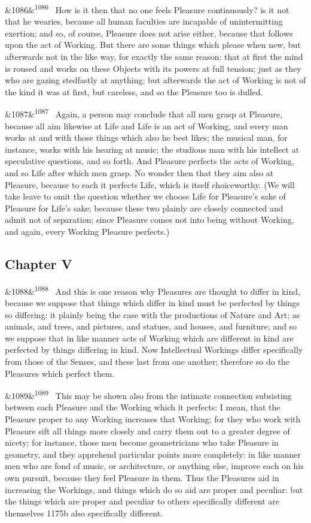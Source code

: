 \documentclass[12pt]{article}
\newcommand{\para}[1][]{\par\noindent\ifx&#1&\else\textsuperscript{\footnotesize #1}~\fi}
\begin{document}
\para[1086] How is it then that no one feels Pleasure continuously? is it not that he wearies, because all human faculties are incapable of unintermitting exertion; and so, of course, Pleasure does not arise either, because that follows upon the act of Working. But there are some things which please when new, but afterwards not in the like way, for exactly the same reason: that at first the mind is roused and works on these Objects with its powers at full tension; just as they who are gazing stedfastly at anything; but afterwards the act of Working is not of the kind it was at first, but careless, and so the Pleasure too is dulled.

\para[1087] Again, a person may conclude that all men grasp at Pleasure, because all aim likewise at Life and Life is an act of Working, and every man works at and with those things which also he best likes; the musical man, for instance, works with his hearing at music; the studious man with his intellect at speculative questions, and so forth. And Pleasure perfects the acts of Working, and so Life after which men grasp. No wonder then that they aim also at Pleasure, because to each it perfects Life, which is itself choiceworthy. (We will take leave to omit the question whether we choose Life for Pleasure's sake of Pleasure for Life's sake; because these two plainly are closely connected and admit not of separation; since Pleasure comes not into being without Working, and again, every Working Pleasure perfects.)

\subsection*{Chapter V}

\para[1088] And this is one reason why Pleasures are thought to differ in kind, because we suppose that things which differ in kind must be perfected by things so differing: it plainly being the case with the productions of Nature and Art; as animals, and trees, and pictures, and statues, and houses, and furniture; and so we suppose that in like manner acts of Working which are different in kind are perfected by things differing in kind. Now Intellectual Workings differ specifically from those of the Senses, and these last from one another; therefore so do the Pleasures which perfect them.

\para[1089] This may be shown also from the intimate connection subsisting between each Pleasure and the Working which it perfects: I mean, that the Pleasure proper to any Working increases that Working; for they who work with Pleasure sift all things more closely and carry them out to a greater degree of nicety; for instance, those men become geometricians who take Pleasure in geometry, and they apprehend particular points more completely: in like manner men who are fond of music, or architecture, or anything else, improve each on his own pursuit, because they feel Pleasure in them. Thus the Pleasures aid in increasing the Workings, and things which do so aid are proper and peculiar: but the things which are proper and peculiar to others specifically different are themselves 1175b also specifically different.
\end{document}
